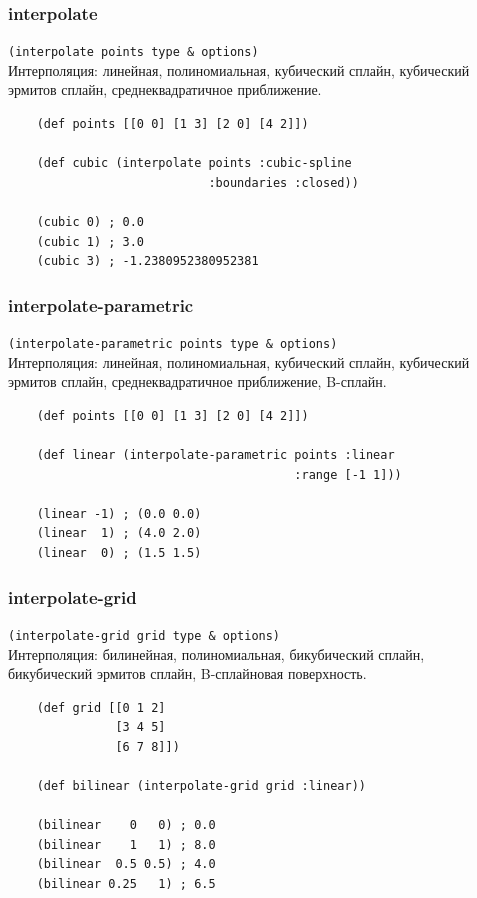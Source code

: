 \documentclass[russian]{beamer}
\begin{document}
\begin{frame}[fragile]
  \frametitle{interpolate}
  \verb+(interpolate points type & options)+ \\
  \vspace{0.5cm}
  Интерполяция: линейная, полиномиальная, кубический сплайн, кубический эрмитов сплайн, среднеквадратичное приближение.
  \vspace{0.5cm}
  \begin{verbatim}
    (def points [[0 0] [1 3] [2 0] [4 2]])

    (def cubic (interpolate points :cubic-spline
                            :boundaries :closed))

    (cubic 0) ; 0.0
    (cubic 1) ; 3.0
    (cubic 3) ; -1.2380952380952381
  \end{verbatim}
\end{frame}


\begin{frame}[fragile]
  \frametitle{interpolate-parametric}
  \verb+(interpolate-parametric points type & options)+ \\
  \vspace{0.5cm}
  Интерполяция: линейная, полиномиальная, кубический сплайн, кубический эрмитов сплайн, среднеквадратичное приближение, B-сплайн.
  \vspace{0.5cm}
  \begin{verbatim}
    (def points [[0 0] [1 3] [2 0] [4 2]])

    (def linear (interpolate-parametric points :linear
                                        :range [-1 1]))

    (linear -1) ; (0.0 0.0)
    (linear  1) ; (4.0 2.0)
    (linear  0) ; (1.5 1.5)
  \end{verbatim}
\end{frame}


\begin{frame}[fragile]
  \frametitle{interpolate-grid}
  \verb+(interpolate-grid grid type & options)+ \\
  \vspace{0.5cm}
  Интерполяция: билинейная, полиномиальная, бикубический сплайн, бикубический эрмитов сплайн, B-сплайновая поверхность.
  \vspace{0.5cm}
  \begin{verbatim}
    (def grid [[0 1 2]
               [3 4 5]
               [6 7 8]])

    (def bilinear (interpolate-grid grid :linear))

    (bilinear    0   0) ; 0.0
    (bilinear    1   1) ; 8.0
    (bilinear  0.5 0.5) ; 4.0
    (bilinear 0.25   1) ; 6.5
  \end{verbatim}
\end{frame}
\end{document}
